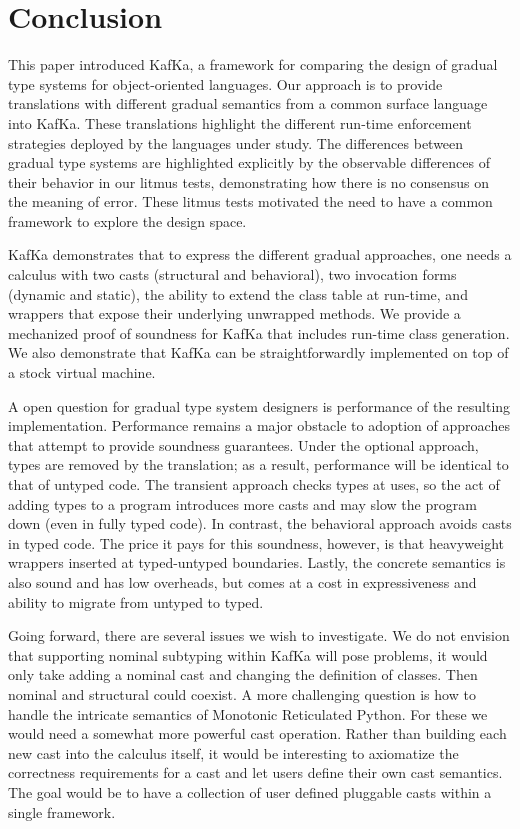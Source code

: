 \documentclass[a4paper,UKenglish]{lipics-v2018}
\newcommand{\kafka}{{\sf KafKa}\xspace}
\newcounter{lem}
\begin{document}
\section{Conclusion}

This paper introduced \kafka, a framework for comparing the design of
gradual type systems for object-oriented languages. Our approach is to provide
translations with different gradual semantics from a common surface language
into \kafka. These translations highlight the different run-time enforcement
strategies deployed by the languages under study. The differences between
gradual type systems are highlighted explicitly by the observable differences
of their behavior in our litmus tests, demonstrating how there is no consensus
on the meaning of error. These litmus tests motivated the need to have a
common framework to explore the design space.

\kafka demonstrates that to express the different gradual approaches, one
needs a calculus with two casts (structural and behavioral), two
invocation forms (dynamic and static), the ability to extend the
class table at run-time, and wrappers that expose their underlying
unwrapped methods. We provide a mechanized proof of soundness for \kafka
that includes run-time class generation. We also demonstrate that \kafka
can be straightforwardly implemented on top of a stock virtual machine.

\enlargethispage{-1\baselineskip}
A open question for gradual type system designers is performance of the
resulting implementation. Performance remains a major obstacle to adoption
of approaches that attempt to provide soundness guarantees. Under the
optional approach, types are removed by the translation; as a result,
performance will be identical to that of untyped code. The transient
approach checks types at uses, so the act of adding types to a program
introduces more casts and may slow the program down (even in fully typed code). 
In contrast, the behavioral approach avoids casts in
typed code. The price it pays for this soundness, however, is that heavyweight
wrappers inserted at typed-untyped boundaries. Lastly, the concrete
semantics is also sound and has low overheads, but comes at a cost in
expressiveness and ability to migrate from untyped to typed.

Going forward, there are several issues we wish to investigate. We do not
envision that supporting nominal subtyping within \kafka will pose problems,
it would only take adding a nominal cast and changing the definition of
classes. Then nominal and structural could coexist. A more challenging
question is how to handle the intricate semantics of Monotonic Reticulated
Python. For these we would need a somewhat more powerful cast operation.
Rather than building each new cast into the calculus itself, it would be
interesting to axiomatize the correctness requirements for a cast and let
users define their own cast semantics. The goal would be to have a
collection of user defined pluggable casts within a single framework.




\end{document}
